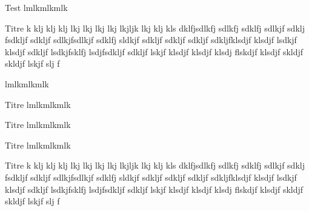 \documentclass[10pt]{article}
\newenvironment{gbar}[1]{ %
\def\ FrameCommand{{\color {#1}\vrule width 3pt}\colorbox{fbase}}%
\MakeFramed {\advance\hsize -\width \FrameRestore}}%
{\endMakeFramed}
\begin{document}
\begin{minipage}[c]{.32\linewidth}
\begin{bclogo}[logo =\bcinfo,barre=none,noborder= true]{Test}%
\begin{gbar}{yellow}
lmlkmlkmlk
\end{gbar}
\end{bclogo}
\end{minipage} \hfill
\begin{minipage}[c]{.32\linewidth}
\begin{bclogo}[couleur=blue!30,logo=\bcquestion,barre=snake]{Titre}
 k klj klj klj lkj lkj lkj lkj lkjljk lkj klj kls dklfjsdlkfj sdlkfj sdklfj sdlkjf sdklj fsdkljf sdkljf sdlkjfsdlkjf sdklfj sldkjf sdkljf sdkljf sdkljf sdkljfklsdjf klsdjf lsdkjf klsdjf sdkljf lsdkjfsklfj lsdjfsdkljf sdkljf lskjf klsdjf klsdjf klsdj flskdjf klsdjf skldjf skldjf lskjf slj f
\end{bclogo}
\end{minipage} \hfill
\begin{minipage}[c]{.32\linewidth}
\begin{gbar}{yellow}
lmlkmlkmlk
\end{gbar}
\end{minipage} 

\vspace{2cm}


\begin{minipage}[c]{.32\linewidth}
\begin{bclogo}[couleur=blue!30,logo=\bccrayon]{Titre}
lmlkmlkmlk
\end{bclogo}
\end{minipage} \hfill
\begin{minipage}[c]{.32\linewidth}
\begin{bclogo}[couleur=blue!30, arrondi = 0.1, ombre = true, couleurOmbre=black!60,logo=\bctrefle,blur]{Titre}
lmlkmlkmlk
\end{bclogo}
\end{minipage} \hfill
\begin{minipage}[c]{.32\linewidth}
\begin{bclogo}[couleur=blue!30,logo=\bctrefle]{Titre}
lmlkmlkmlk
\end{bclogo}
\end{minipage} 

\vspace{2cm}
\begin{bclogo}[couleur=blue!30,logo=\bcquestion,barre=snake]{Titre}
 k klj klj klj lkj lkj lkj lkj lkjljk lkj klj kls dklfjsdlkfj sdlkfj sdklfj sdlkjf sdklj fsdkljf sdkljf sdlkjfsdlkjf sdklfj sldkjf sdkljf sdkljf sdkljf sdkljfklsdjf klsdjf lsdkjf klsdjf sdkljf lsdkjfsklfj lsdjfsdkljf sdkljf lskjf klsdjf klsdjf klsdj flskdjf klsdjf skldjf skldjf lskjf slj f
\end{bclogo}
\end{document}
